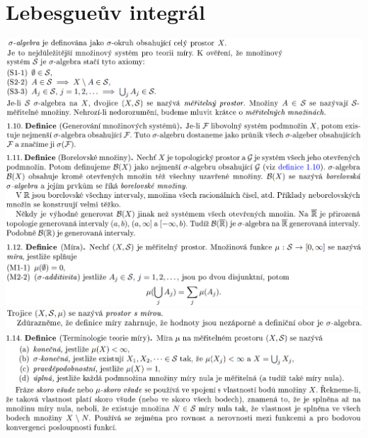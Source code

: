 \documentclass[12pt,a4paper]{article}
\begin{document}
\section{Lebesgueův integrál}
	\begin{center}
		\includegraphics[width=\textwidth]{img/1lebInt/2020-06-20 17 46 09.png}\vspace{0.3cm}
		\includegraphics[width=\textwidth]{img/1lebInt/2020-06-20 17 47 08.png}\vspace{0.3cm}
		\includegraphics[width=\textwidth]{img/1lebInt/2020-06-20 17 49 20.png}\vspace{0.3cm}
		\includegraphics[width=\textwidth]{img/1lebInt/2020-06-20 17 49 44.png}\vspace{0.3cm}
		\includegraphics[width=\textwidth]{img/1lebInt/2020-06-20 17 49 57.png}\vspace{0.3cm}
		\includegraphics[width=\textwidth]{img/1lebInt/2020-06-20 17 50 33.png}\vspace{0.3cm}

\end{center}
\end{document}

